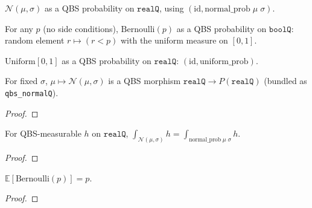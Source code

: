 \begin{definition}\label{def:qbs_normal}
  \rocqok
  $\mathcal{N}(\mu, \sigma)$ as a QBS probability on $\mathtt{realQ}$,
  using $(\mathrm{id}, \mathrm{normal\_prob}\; \mu\; \sigma)$.
\end{definition}

\begin{definition}\label{def:qbs_bernoulli}
  \rocqok
  For any $p$ (no side conditions), $\mathrm{Bernoulli}(p)$ as a QBS probability on
  $\mathtt{boolQ}$: random element $r \mapsto (r < p)$ with the uniform
  measure on $[0,1]$.
\end{definition}

\begin{definition}\label{def:qbs_uniform}
  \rocqok
  $\mathrm{Uniform}[0,1]$ as a QBS probability on $\mathtt{realQ}$:
  $(\mathrm{id}, \mathrm{uniform\_prob})$.
\end{definition}

\begin{lemma}\label{lem:qbs_morphism_normal}
  \rocqok
  For fixed $\sigma$, $\mu \mapsto \mathcal{N}(\mu, \sigma)$ is a QBS
  morphism $\mathtt{realQ} \to P(\mathtt{realQ})$ (bundled as
  \texttt{qbs\_normalQ}).
\end{lemma}
\begin{proof}\rocqok\end{proof}

\begin{lemma}\label{lem:qbs_integral_normal}
  \rocqok
  For QBS-measurable $h$ on $\mathtt{realQ}$,
  $\int_{\mathcal{N}(\mu, \sigma)} h = \int_{\mathrm{normal\_prob}\;\mu\;\sigma} h$.
\end{lemma}
\begin{proof}\rocqok\end{proof}

\begin{lemma}\label{lem:qbs_expect_bernoulli}
  \rocqok
  $\mathbb{E}[\mathrm{Bernoulli}(p)] = p$.
\end{lemma}
\begin{proof}\rocqok\end{proof}

